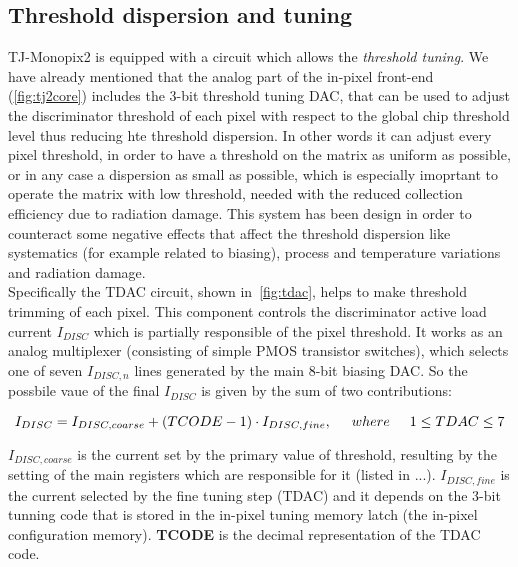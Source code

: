 \subsection{Threshold dispersion and tuning} \label{sec:tuning}


TJ-Monopix2 is equipped with a circuit which allows the \textit{threshold tuning}. We have already mentioned that the analog part of the in-pixel front-end (\autoref{fig:tj2core}) includes the 3-bit threshold tuning DAC, that can be used to adjust the discriminator threshold of each pixel with respect to the global chip threshold level thus reducing hte threshold dispersion. In other words it can adjust every pixel threshold, in order to have a threshold on the matrix as uniform as possible, or in any case a dispersion as small as possible, which is especially imoprtant to operate the matrix with low threshold, needed with the reduced collection efficiency due to radiation damage.  This system has been design in order to counteract some negative effects that affect the threshold dispersion like systematics (for example related to biasing), process and temperature variations and radiation damage. \\

Specifically the TDAC circuit, shown in~\autoref{fig:tdac}, helps to make threshold trimming of each pixel. This component controls the discriminator active load current $I_{DISC}$ which is partially responsible of the pixel threshold. It works as an analog multiplexer (consisting of simple PMOS transistor switches), which selects one of seven $I_{DISC, n}$ lines generated by the main 8-bit biasing DAC. So the possbile vaue of the final $I_{DISC}$ is given by the sum of two contributions:

\begin{equation}
I_{DISC} = I_{DISC, coarse} + (TCODE - 1) \cdot I_{DISC,fine},  \hspace{.5cm}	where \hspace{.5cm} 1 \leq TDAC \leq 7
\label{eq:tuning_eq}
\end{equation}

\textbf{$I_{DISC, coarse}$} is the current set by the primary value of threshold, resulting by the setting of the main registers which are responsible for it (listed in ...). 
\textbf{$I_{DISC, fine}$} is the current selected by the fine tuning step (TDAC) and it depends on the 3-bit tunning code that is stored in the in-pixel tuning memory latch (the in-pixel configuration memory).
\textbf{TCODE} is the decimal representation of the TDAC code. 

